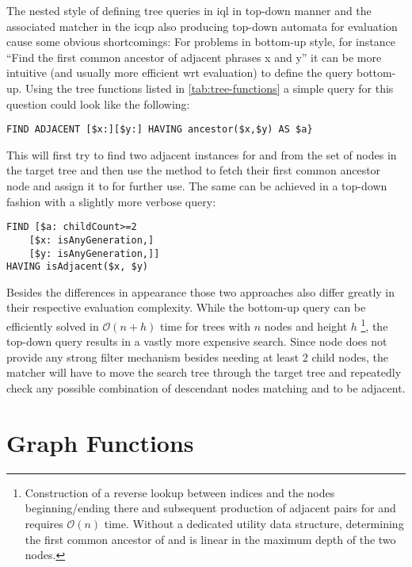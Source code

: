 \documentclass[11pt,a4paper]{report}
\begin{document}
The nested style of defining tree queries in \ac{iql} in top-down manner and the associated matcher in the \ac{icqp} also producing top-down automata for evaluation cause some obvious shortcomings:
For problems in bottom-up style, for instance ``Find the first common ancestor of adjacent phrases x and y'' it can be more intuitive (and usually more efficient wrt evaluation) to define the query bottom-up.
Using the tree functions listed in \cref{tab:tree-functions} a simple query for this question could look like the following: 
\begin{Verbatim}[samepage=true]
FIND ADJACENT [$x:][$y:] HAVING ancestor($x,$y) AS $a}
\end{Verbatim}
This will first try to find two adjacent instances for  and  from the set of nodes in the target tree and then use the  method to fetch their first common ancestor node and assign it to  for further use.
The same can be achieved in a top-down fashion with a slightly more verbose query:
\begin{Verbatim}[samepage=true]
FIND [$a: childCount>=2
    [$x: isAnyGeneration,] 
    [$y: isAnyGeneration,]]
HAVING isAdjacent($x, $y)
\end{Verbatim}
Besides the differences in appearance those two approaches also differ greatly in their respective evaluation complexity.
While the bottom-up query can be efficiently solved in $\mathcal{O}(n+h)$ time for trees with $n$ nodes and height $h$ \footnote{Construction of a reverse lookup between indices and the nodes beginning/ending there and subsequent production of adjacent pairs for  and  requires $\mathcal{O}(n)$ time. Without a dedicated utility data structure, determining the first common ancestor of  and  is linear in the maximum depth of the two nodes.}, the top-down query results in a vastly more expensive search.
Since node  does not provide any strong filter mechanism besides needing at least 2 child nodes, the matcher will have to move the search tree through the target tree and repeatedly check any possible combination of descendant nodes matching  and  to be adjacent.

\section{Graph Functions}
\label{sec:graph-functions}
\end{document}

